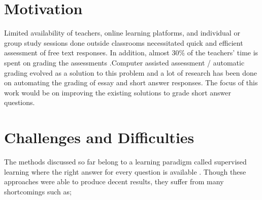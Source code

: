 \section{Motivation}

Limited availability of teachers, online learning platforms, and individual or group study sessions done outside classrooms necessitated quick and efficient assessment of free text responses. In addition, almost 30\% of the teachers' time is spent on grading the assessments \cite{mason2002}.Computer assisted assessment / automatic grading evolved as a solution to this problem and a lot of research has been done on automating the grading of essay\cite{Higgins2004} and short answer responses\cite{Leacock2003, Pulman2005, Mohler2009}. The focus of this work would be on improving the existing solutions to grade short answer questions.





\section{Challenges and Difficulties}

The methods discussed so far belong to a learning paradigm called supervised learning where the right answer for every question is available \cite{Horbach2016}. Though these approaches were able to produce decent results, they suffer from many shortcomings such as;

